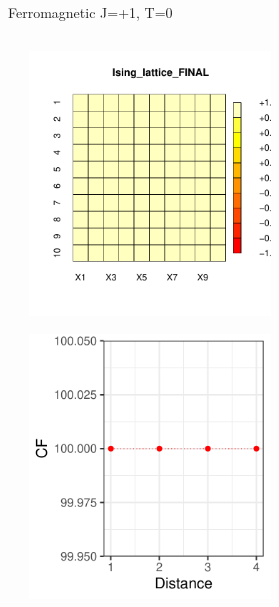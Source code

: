 \documentclass{beamer}
\begin{document}
\begin{frame}{Ferromagnetic J=+1, T=0}
\begin{columns}
\begin{column}{0.5\textwidth}
\begin{center}
     \end{center}
\end{column}
\begin{column}{0.5\textwidth}
    \begin{center}
     \includegraphics[width=0.5\textwidth]{Pic/J+1_10_6000_T=0_FINAL.pdf}
     \end{center}
         \begin{center}
     \includegraphics[width=0.5\textwidth]{Pic/J+1_10_6000_T=0_Coherence.pdf}
     \end{center}
\end{column}
\end{columns}
\end{frame}
\end{document}
